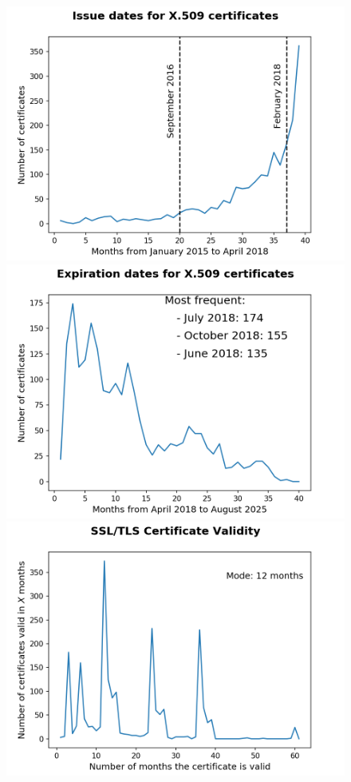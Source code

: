 \documentclass{easychair}
\begin{document}
\begin{figure}[!htb]
    \begin{centering}
        \includegraphics[width=\linewidth]{plot-issue.png}
    \endminipage\hfill
        \includegraphics[width=\linewidth]{plot-expiration.png}
    \endminipage\hfill
        \includegraphics[width=\linewidth]{plot-certificate_lengths.png}

\end{centering}
\end{figure}
\end{document}
